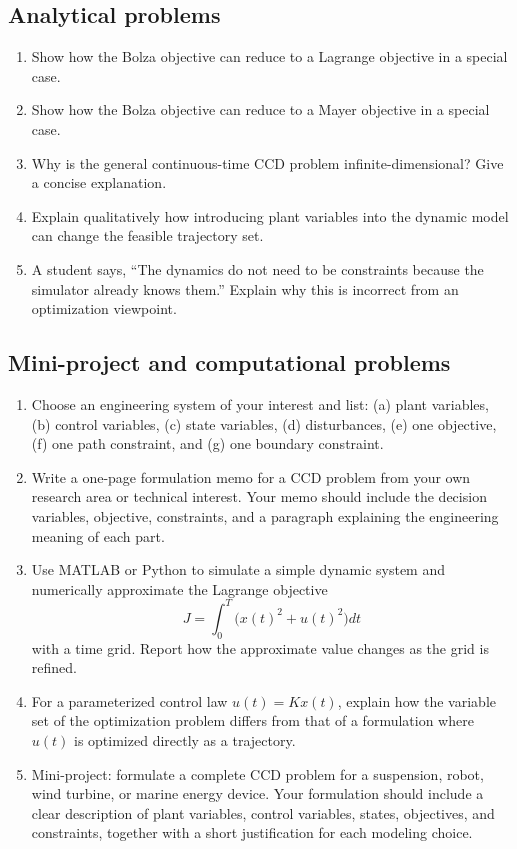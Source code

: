 \documentclass[11pt]{article}
\begin{document}
\subsection*{Analytical problems}
\begin{enumerate}[leftmargin=1.5em,label=\textbf{P\arabic*.},resume]
  \item Show how the Bolza objective can reduce to a Lagrange objective in a special case.
  \item Show how the Bolza objective can reduce to a Mayer objective in a special case.
  \item Why is the general continuous-time CCD problem infinite-dimensional? Give a concise explanation.
  \item Explain qualitatively how introducing plant variables into the dynamic model can change the feasible trajectory set.
  \item A student says, ``The dynamics do not need to be constraints because the simulator already knows them.'' Explain why this is incorrect from an optimization viewpoint.
\end{enumerate}

\subsection*{Mini-project and computational problems}
\begin{enumerate}[leftmargin=1.5em,label=\textbf{P\arabic*.},resume]
  \item Choose an engineering system of your interest and list: (a) plant variables, (b) control variables, (c) state variables, (d) disturbances, (e) one objective, (f) one path constraint, and (g) one boundary constraint.
  \item Write a one-page formulation memo for a CCD problem from your own research area or technical interest. Your memo should include the decision variables, objective, constraints, and a paragraph explaining the engineering meaning of each part.
  \item Use MATLAB or Python to simulate a simple dynamic system and numerically approximate the Lagrange objective
  \begin{equation*}
  J=\int_{0}^{T}\big(x(t)^2+u(t)^2\big)dt
  \end{equation*}
  with a time grid. Report how the approximate value changes as the grid is refined.
  \item For a parameterized control law $u(t)=Kx(t)$, explain how the variable set of the optimization problem differs from that of a formulation where $u(t)$ is optimized directly as a trajectory.
  \item Mini-project: formulate a complete CCD problem for a suspension, robot, wind turbine, or marine energy device. Your formulation should include a clear description of plant variables, control variables, states, objectives, and constraints, together with a short justification for each modeling choice.
\end{enumerate}
\end{document}
